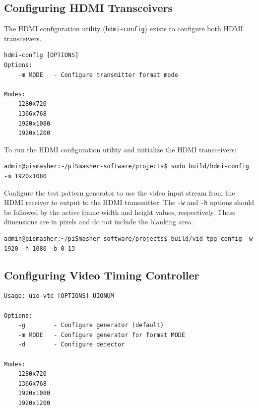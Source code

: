 \documentclass[sfsidenotes, justified]{tufte-handout}
\begin{document}
	\subsection{Configuring HDMI Transceivers}    
    
  The HDMI configuration utility (\texttt{hdmi-config}) exists to configure both HDMI transceivers.
         
	\begin{lstlisting}[style=text]
hdmi-config [OPTIONS]
Options:
    -m MODE   - Configure transmitter format mode

Modes:
    1280x720
    1366x768
    1920x1080
    1920x1200
	\end{lstlisting}
	
	To run the HDMI configuration utility and initialize the HDMI transceivers:

\begin{fullwidth}
\begin{lstlisting}
admin@pismasher:~/piSmasher-software/projects$ sudo build/hdmi-config -m 1920x1080
\end{lstlisting}
\end{fullwidth}
    
	Configure the test pattern generator to use the video input stream from the HDMI receiver to output to the HDMI transmitter. The \texttt{-w} and \texttt{-h} options should be followed by the active frame width and height values, respectively. These dimensions are in pixels and do not include the blanking area. 
	
\begin{fullwidth}
\begin{lstlisting}
admin@pismasher:~/piSmasher-software/projects$ build/vid-tpg-config -w 1920 -h 1080 -b 0 13
\end{lstlisting}
\end{fullwidth}


	\subsection{Configuring Video Timing Controller}

	\begin{lstlisting}[style=text]
Usage: uio-vtc [OPTIONS] UIONUM

Options:
    -g        - Configure generator (default)
    -m MODE   - Configure generator for format MODE
    -d        - Configure detector

Modes:
    1280x720
    1366x768
    1920x1080
    1920x1200
	\end{lstlisting}
\end{document}
